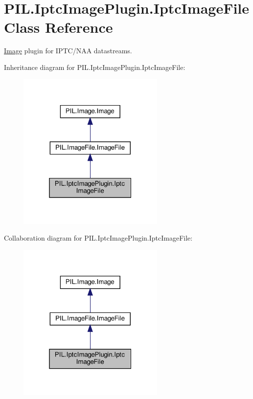 \hypertarget{classPIL_1_1IptcImagePlugin_1_1IptcImageFile}{}\section{P\+I\+L.\+Iptc\+Image\+Plugin.\+Iptc\+Image\+File Class Reference}
\label{classPIL_1_1IptcImagePlugin_1_1IptcImageFile}


\hyperlink{namespacePIL_1_1Image}{Image} plugin for I\+P\+T\+C/\+N\+AA datastreams.  




Inheritance diagram for P\+I\+L.\+Iptc\+Image\+Plugin.\+Iptc\+Image\+File\+:
\nopagebreak
\begin{figure}[H]
\begin{center}
\leavevmode
\includegraphics[width=205pt]{classPIL_1_1IptcImagePlugin_1_1IptcImageFile__inherit__graph}
\end{center}
\end{figure}


Collaboration diagram for P\+I\+L.\+Iptc\+Image\+Plugin.\+Iptc\+Image\+File\+:
\nopagebreak
\begin{figure}[H]
\begin{center}
\leavevmode
\includegraphics[width=205pt]{classPIL_1_1IptcImagePlugin_1_1IptcImageFile__coll__graph}
\end{center}
\end{figure}
